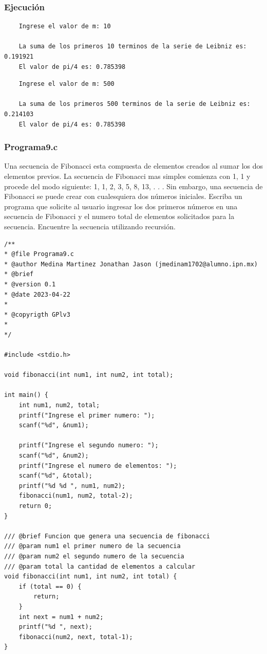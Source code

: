 \documentclass{article}
\begin{document}
	\newpage
	
	\subsubsection{Ejecución}
	
	\begin{lstlisting}
	Ingrese el valor de m: 10
	
	La suma de los primeros 10 terminos de la serie de Leibniz es: 0.191921
	El valor de pi/4 es: 0.785398
	\end{lstlisting}
	
	\begin{lstlisting}
	Ingrese el valor de m: 500
	
	La suma de los primeros 500 terminos de la serie de Leibniz es: 0.214103
	El valor de pi/4 es: 0.785398
	\end{lstlisting}
	
	\newpage
	
	\subsubsection{Programa9.c}
	
	Una secuencia de Fibonacci esta compuesta de elementos creados al sumar los dos elementos previos. La secuencia de Fibonacci mas simples comienza con 1, 1 y procede del modo siguiente: 1, 1, 2, 3, 5, 8, 13, . . .
	Sin embargo, una secuencia de Fibonacci se puede crear con cualesquiera dos números iniciales.
	Escriba un programa que solicite al usuario ingresar los dos primeros números en una secuencia de Fibonacci y el numero total de elementos solicitados para la secuencia.
	Encuentre la secuencia utilizando recursión.
	
	\begin{lstlisting}
/**
* @file Programa9.c
* @author Medina Martinez Jonathan Jason (jmedinam1702@alumno.ipn.mx)
* @brief 
* @version 0.1
* @date 2023-04-22
* 
* @copyrigth GPlv3
* 
*/

#include <stdio.h>

void fibonacci(int num1, int num2, int total);

int main() {
	int num1, num2, total;
	printf("Ingrese el primer numero: ");
	scanf("%d", &num1);
	
	printf("Ingrese el segundo numero: ");
	scanf("%d", &num2);
	printf("Ingrese el numero de elementos: ");
	scanf("%d", &total);
	printf("%d %d ", num1, num2);
	fibonacci(num1, num2, total-2);
	return 0;
}

/// @brief Funcion que genera una secuencia de fibonacci
/// @param num1 el primer numero de la secuencia
/// @param num2 el segundo numero de la secuencia
/// @param total la cantidad de elementos a calcular
void fibonacci(int num1, int num2, int total) {
	if (total == 0) {
		return;
	}
	int next = num1 + num2;
	printf("%d ", next);
	fibonacci(num2, next, total-1);
}

	\end{lstlisting}
	
\end{document}
